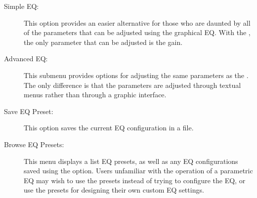 {\begin {description}
	\item[Simple EQ:]	
	This option provides an easier alternative for those who are daunted by all of 
	the parameters that can be adjusted using the graphical EQ.  With the 
	, the only parameter that can be adjusted is the gain.

	\item[Advanced EQ:]
	This submenu provides options for adjusting the same parameters as the 
	.  The only difference is that the parameters are 
	adjusted through textual menus rather than through a graphic interface.
	
	\item[Save EQ Preset:]
	This option saves the current EQ configuration in a  file.
	
	\item[Browse EQ Presets:]
	This menu displays a list EQ presets, as well as any EQ configurations saved 
	using the  option.  Users unfamiliar with the 
	operation of a parametric EQ may wish to use the presets instead of trying to 
	configure the EQ, or use the presets for designing their own custom EQ 
	settings.
	
\end{description}
}

